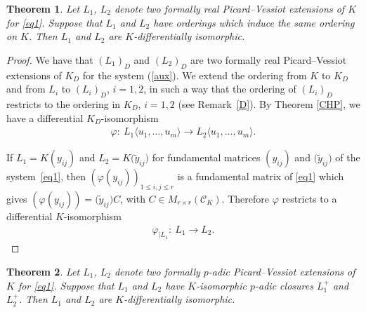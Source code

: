 \documentclass[10pt,a4paper]{amsart}
\numberwithin{equation}{section}
\newtheorem{Theorem}{Theorem}[section]
\begin{document}
\begin{Theorem}\label{realuni} Let $L_1$, $L_2$ denote two formally real Picard--Vessiot extensions of $K$ for \eqref{eq1}. Suppose that $L_1$ and $L_2$ have orderings which induce the same ordering on $K$. Then $L_1$ and $L_2$ are $K$-differentially isomorphic.
\end{Theorem}

\begin{proof}
 We have that $(L_1)_D$ and $(L_2)_D$ are two formally real Picard--Vessiot extensions of $K_D$ for the system (\ref{aux}). We extend the ordering from $K$ to $K_D$ and from $L_i$ to $(L_i)_D$, $i=1,2$, in such a way that the ordering of $(L_i)_D$ restricts to the ordering in $K_D$, $i=1,2$ (see Remark~\ref{D}). By Theorem \ref{CHP}, we have a differential $K_D$-isomorphism
\begin{gather*}
\varphi\colon\ L_1\langle u_1,\dots,u_m \rangle \rightarrow L_2\langle u_1,\dots,u_m \rangle.
\end{gather*}

If $L_1=K(y_{ij})$ and $L_2=K\big(\widetilde{y}_{ij}\big)$ for fundamental matrices $(y_{ij})$ and $\big(\widetilde{y}_{ij}\big)$ of the system~\eqref{eq1}, then $(\varphi(y_{ij}))_{1\leq i,j\leq r}$ is a fundamental matrix of \eqref{eq1} which gives $(\varphi(y_{ij}))=\big(\widetilde{y}_{ij}\big) C$, with $C \in M_{r\times r} (\mathcal{C}_K)$. Therefore $\varphi$ restricts to a differential $K$-isomorphism
\begin{gather*}
\varphi_{|L_1}\colon\ L_1 \rightarrow L_2. \tag*{\qed}
\end{gather*}
\renewcommand{\qed}{}
\end{proof}


\begin{Theorem} Let $L_1$, $L_2$ denote two formally $p$-adic Picard--Vessiot extensions of $K$ for \eqref{eq1}. Suppose that $L_1$ and $L_2$
have $K$-isomorphic $p$-adic closures $L_1^+$ and $L_2^+$. Then $L_1$ and $L_2$ are $K$-differentially isomorphic.
\end{Theorem}
\end{document}

